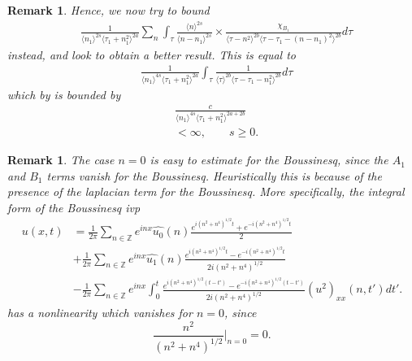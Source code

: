 \documentclass[12pt,reqno]{amsart}
\numberwithin{equation}{section}  %
\renewcommand{\cref}{\Cref}
\newcommand{\zz}{\mathbb{Z}}
\newcommand{\wh}{\widehat}
\newtheorem{remark}[theorem]{Remark}
\begin{document}
\begin{framed}
\begin{remark}
%
%
%
Hence, we now try to bound
\begin{equation}
\begin{split}
  & \frac{1}{\langle n_{1} \rangle ^{2s}
  \langle \tau_{1} + n_{1}^{2} \rangle
  ^{2a}} \sum_{n } \int_{\tau} \frac{\langle n \rangle ^{2s}}{\langle
  n - n_{1}\rangle ^{2s}}  \times \frac{\chi_{B_{1}}}{\langle
  \tau - n^{2}  \rangle^{2b}  \langle \tau - \tau_{1} - (n - n_{1})^{2}
  \rangle^{2b} } d \tau 
\end{split}
\end{equation}
instead, and look to obtain a better result. This is equal to 
%
\begin{equation*}
\begin{split}
  & \frac{1}{\langle n_{1} \rangle ^{4s}
  \langle \tau_{1} + n_{1}^{2} \rangle
  ^{2a}} \int_{\tau} \frac{1}{\langle
  \tau  \rangle^{2b}  \langle \tau - \tau_{1} - n_{1}^{2}
  \rangle^{2b} } d \tau
\end{split}
\end{equation*}
%
%
which by \cref{lem:calc} is bounded by
%
%
\begin{equation*}
\begin{split}
  & \frac{c}{\langle n_{1} \rangle ^{4s}
  \langle \tau_{1} + n_{1}^{2} \rangle
  ^{2a + 2b}}
\\
& < \infty, \qquad s \ge 0. 
\end{split}
\end{equation*}
%
\end{remark}
\end{framed}
%
%
\begin{framed}
\begin{remark}
The case $n=0$ is easy to estimate for the Boussinesq, since the
$A_{1}$ and $B_{1}$ terms vanish for the Boussinesq. Heuristically this is
because of the presence of the laplacian term for the Boussinesq. More
specifically, the integral form of the Boussinesq ivp
\begin{equation*}
  \begin{split}
    u(x,t)
    & = \frac{1}{2\pi}\sum_{n \in \zz} e^{inx} \wh{u_{0}}(n) \frac{e^{i(n^{2} + n^{4})^{1/2}t} + e^{-i(n^{2} + n^{4})^{1/2}t}}{2} 
    \\
    & + \frac{1}{2 \pi}\sum_{n \in \zz} e^{inx}
    \wh{u_{1}}(n)\frac{e^{i(n^{2} + n^{4})^{1/2}t} - e^{-i(n^{2} + n^{4})^{1/2}t}}{2 i (n^{2} +
    n^{4})^{1/2}} 
    \\
    & - \frac{1}{2 \pi}\sum_{n \in \zz} e^{inx}
    \int_{0}^{t}\frac{e^{i(n^{2} + n^{4})^{1/2}(t-t')}-e^{-i(n^{2} + n^{4})^{1/2}(t-t')}}{2 i (n^{2} +
    n^{4})^{1/2}}
    \wh{(u^{2})_{xx}}(n, t') dt'.
  \end{split}
\end{equation*}
has a nonlinearity which vanishes for $n =0$, since 
$$\frac{n^{2}}{(n^{2} + n^{4})^{1/2}} |_{n=0} = 0.$$ 
\label{rem:bous-easier}
\end{remark}
\end{framed}
\end{document}
